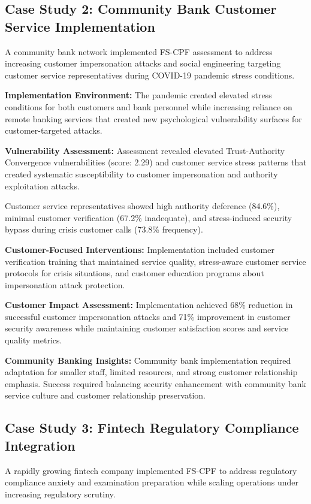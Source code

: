 \documentclass[10pt, twocolumn]{article}
\begin{document}
\subsection{Case Study 2: Community Bank Customer Service Implementation}

A community bank network implemented FS-CPF assessment to address increasing customer impersonation attacks and social engineering targeting customer service representatives during COVID-19 pandemic stress conditions.

\textbf{Implementation Environment:} The pandemic created elevated stress conditions for both customers and bank personnel while increasing reliance on remote banking services that created new psychological vulnerability surfaces for customer-targeted attacks.

\textbf{Vulnerability Assessment:} Assessment revealed elevated Trust-Authority Convergence vulnerabilities (score: 2.29) and customer service stress patterns that created systematic susceptibility to customer impersonation and authority exploitation attacks.

Customer service representatives showed high authority deference (84.6\%), minimal customer verification (67.2\% inadequate), and stress-induced security bypass during crisis customer calls (73.8\% frequency).

\textbf{Customer-Focused Interventions:} Implementation included customer verification training that maintained service quality, stress-aware customer service protocols for crisis situations, and customer education programs about impersonation attack protection.

\textbf{Customer Impact Assessment:} Implementation achieved 68\% reduction in successful customer impersonation attacks and 71\% improvement in customer security awareness while maintaining customer satisfaction scores and service quality metrics.

\textbf{Community Banking Insights:} Community bank implementation required adaptation for smaller staff, limited resources, and strong customer relationship emphasis. Success required balancing security enhancement with community bank service culture and customer relationship preservation.

\subsection{Case Study 3: Fintech Regulatory Compliance Integration}

A rapidly growing fintech company implemented FS-CPF to address regulatory compliance anxiety and examination preparation while scaling operations under increasing regulatory scrutiny.
\end{document}
